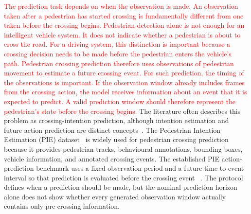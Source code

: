\documentclass[mti,article,submit,moreauthors]{Definitions/mdpi}
\begin{document}
\textcolor{red}{The prediction task depends on when the observation is made. An observation taken after a pedestrian has started crossing is fundamentally different from one taken before the crossing begins. Pedestrian detection alone is not enough for an intelligent vehicle system. It does not indicate whether a pedestrian is about to cross the road. For a driving system, this distinction is important because a crossing decision needs to be made before the pedestrian enters the vehicle's path. Pedestrian crossing prediction therefore uses observations of pedestrian movement to estimate a future crossing event. For such prediction, the timing of the observations is important. If the observation window already includes frames from the crossing action, the model receives information about an event that it is expected to predict. A valid prediction window should therefore represent the pedestrian's state before the crossing begins.} The literature often describes this problem as crossing-intention prediction,
although intention estimation and future action prediction are distinct
concepts~\citep{rasouli2024diving}.
The Pedestrian Intention Estimation (PIE) dataset~\citep{rasouli2019pie} is widely used
for pedestrian crossing prediction because it provides pedestrian tracks, behavioural annotations, bounding boxes, vehicle information, and annotated crossing events. The
established PIE action-prediction benchmark uses a fixed observation period and a future
time-to-event interval so that prediction is evaluated before the crossing event
~\citep{kotseruba2021benchmark}. The protocol defines when a prediction should be made,
but the nominal prediction horizon alone does not show whether every generated observation
window actually contains only pre-crossing information.
\end{document}
